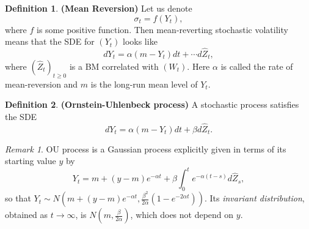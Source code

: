 \documentclass[a4paper,12pt]{article}
\numberwithin{equation}{section}
\theoremstyle{definition}
\newtheorem{definition}{Definition}[section]
\theoremstyle{remark}
\newtheorem{remark}{Remark}[section]
\begin{document}
\begin{definition}
\textbf{(Mean Reversion)} Let us denote 
\begin{equation}
    \sigma_{t}=f(Y_{t}),
\end{equation}
where $f$ is some positive function. 
Then mean-reverting stochastic volatility means that the SDE for 
$(Y_t)$ looks like
\begin{equation}
    dY_{t}=\alpha(m-Y_{t})dt+\cdots d\hat{Z}_{t},
\end{equation}
where $(\hat{Z}_{t})_{t\geq 0}$ is a BM correlated with $(W_t)$. 
Here $\alpha$ is called the rate of mean-reversion and $m$ is the 
long-run mean level of $Y_t$.
\end{definition}

\begin{definition}
\textbf{(Ornstein-Uhlenbeck process)} A stochastic process 
satisfies the SDE 
\begin{equation}
\label{eq:OU_process}
    dY_{t}=\alpha(m-Y_{t})dt+\beta d\hat{Z}_{t}.
\end{equation}
\end{definition}

\begin{remark}
OU process is a Gaussian process explicitly given in terms of its 
starting value $y$ by 
\begin{equation}
\label{eq:OU_solution}
    Y_{t}=m+(y-m)e^{-\alpha t}+\beta\int_{0}^{t} e^{-\alpha(t-s)} d\hat{Z}_{s},
\end{equation}
so that $Y_{t}\sim N(m+(y-m)e^{-\alpha t},\frac{\beta^{2}}{2\alpha}(1-e^{-2\alpha t}))$. 
Its \textit{invariant distribution}, obtained as 
$t\rightarrow\infty$, is $N(m,\frac{\beta}{2\alpha})$, which does 
not depend on $y$.
\end{remark}
\end{document}
